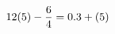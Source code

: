 \documentclass[preview]{standalone}
\begin{document}
\begin{align*}
\special{dvisvgm:raw <g id='unique000'>}12(5) - \frac{6}{4} = 0.3 + (5)\special{dvisvgm:raw </g>}
\end{align*}
\end{document}
